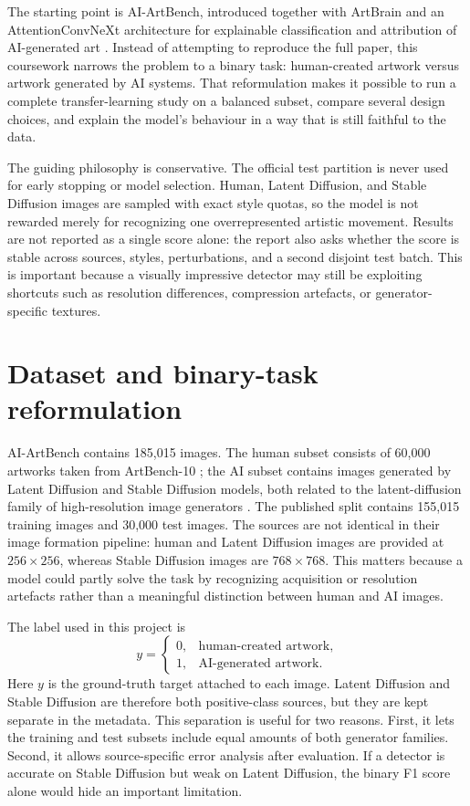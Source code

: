 \documentclass[11pt,a4paper]{article}
\begin{document}
The starting point is AI-ArtBench, introduced together with ArtBrain and an
AttentionConvNeXt architecture for explainable classification and attribution
of AI-generated art \cite{silva2023aiartbench,silva2024artbrain}. Instead of
attempting to reproduce the full paper, this coursework narrows the problem to
a binary task: human-created artwork versus artwork generated by AI systems.
That reformulation makes it possible to run a complete transfer-learning study
on a balanced subset, compare several design choices, and explain the model's
behaviour in a way that is still faithful to the data.

The guiding philosophy is conservative. The official test partition is never
used for early stopping or model selection. Human, Latent Diffusion, and Stable
Diffusion images are sampled with exact style quotas, so the model is not
rewarded merely for recognizing one overrepresented artistic movement. Results
are not reported as a single score alone: the report also asks whether the
score is stable across sources, styles, perturbations, and a second disjoint
test batch. This is important because a visually impressive detector may still
be exploiting shortcuts such as resolution differences, compression artefacts,
or generator-specific textures.

\section{Dataset and binary-task reformulation}

AI-ArtBench contains 185,015 images. The human subset consists of 60,000
artworks taken from ArtBench-10 \cite{liao2022artbench}; the AI subset contains
images generated by Latent Diffusion and Stable Diffusion models, both related
to the latent-diffusion family of high-resolution image generators
\cite{rombach2022latent}. The published split contains 155,015 training images
and 30,000 test images. The sources are not identical in their image formation
pipeline: human and Latent Diffusion images are provided at \(256\times256\),
whereas Stable Diffusion images are \(768\times768\). This matters because a
model could partly solve the task by recognizing acquisition or resolution
artefacts rather than a meaningful distinction between human and AI images.

The label used in this project is
\[
  y =
  \begin{cases}
    0, & \text{human-created artwork},\\
    1, & \text{AI-generated artwork}.
  \end{cases}
\]
Here \(y\) is the ground-truth target attached to each image. Latent Diffusion
and Stable Diffusion are therefore both positive-class sources, but they are
kept separate in the metadata. This separation is useful for two reasons.
First, it lets the training and test subsets include equal amounts of both
generator families. Second, it allows source-specific error analysis after
evaluation. If a detector is accurate on Stable Diffusion but weak on Latent
Diffusion, the binary F1 score alone would hide an important limitation.
\end{document}
